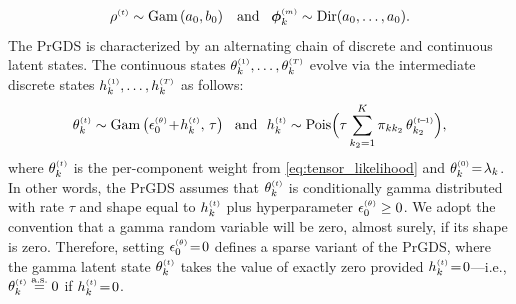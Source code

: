 \documentclass{article}
\begin{document}
\begin{equation}
\rhot \sim \Gam{a_0, b_0} \,\,\,\textrm{ and }\,\,\, \boldsymbol{\phi}^{\mathsmaller{(m)}}_k \sim \textrm{Dir}(a_0,\dots,a_0).
\end{equation}
The PrGDS is characterized by an alternating chain of discrete and continuous latent states. The continuous states $\theta^{\mathsmaller{(1)}}_k, \ldots, \theta^{\mathsmaller{(T)}}_k$ evolve via the intermediate discrete states $h^{\mathsmaller{(1)}}_k, \ldots, h^{\mathsmaller{(T)}}_k$ as follows:~
\begin{equation}
\label{eq:thetaktandhkt}
\thetakt \sim \Gam{\epstheta \tp \hkt,\, \tau} \,\,\textrm{ and }\,\, \hkt \sim \textrm{Pois}\Big(\tau \sum_{k_2 = 1}^K \pi_{kk_2} \,\thetakttm\Big),
\end{equation}
where $\thetakt$ is the per-component weight from \cref{eq:tensor_likelihood} and $\theta^{\mathsmaller{(0)}}_k \teq \lambda_k$. In other words, the PrGDS assumes that $\thetakt$ is conditionally gamma distributed with rate $\tau$ and shape equal to $\hkt$ plus hyperparameter $\epstheta \geq 0$. We adopt the convention that a gamma random variable will be zero, almost surely, if its shape is zero. Therefore, setting $\epstheta \teq 0$ defines a sparse variant of the PrGDS, where the gamma latent state $\thetakt$ takes the value of exactly zero provided $\hkt \teq 0$---i.e., $\thetakt \stackrel{\textrm{a.s.}}{=} 0$ if $\hkt \teq 0$.~
\end{document}
